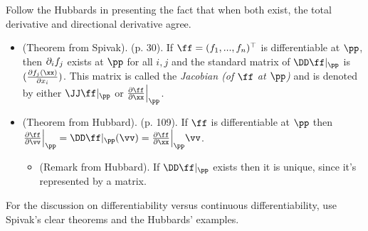 Follow the Hubbards in presenting the fact that when both exist, the total derivative and directional derivative agree.

\begin{itemize}
    \item (Theorem from Spivak). (p. 30). If $\ff = (f_1, ..., f_n)^\top$ is differentiable at $\pp$, then $\partial_i f_j$ exists at $\pp$ for all $i, j$ and the standard matrix of $\DD \ff|_\pp$ is $(\frac{\pd f_j(\xx)}{\pd x_i})$. This matrix is called the \textit{Jacobian (of $\ff$ at $\pp$)} and is denoted by either $\JJ \ff|_\pp$ or $\frac{\pd \ff}{\pd \xx}\Big|_\pp$.
    \item (Theorem from Hubbard). (p. 109). If $\ff$ is differentiable at $\pp$ then $\frac{\pd \ff}{\pd \vv}\Big|_\pp = \DD \ff|_\pp(\vv) = \frac{\pd \ff}{\pd \xx}\Big|_\pp \vv$.
    \begin{itemize}
        \item (Remark from Hubbard). If $\DD \ff|_\pp$ exists then it is unique, since it's represented by a matrix.
    \end{itemize}
\end{itemize}

For the discussion on differentiability versus continuous differentiability, use Spivak's clear theorems and the Hubbards' examples.

